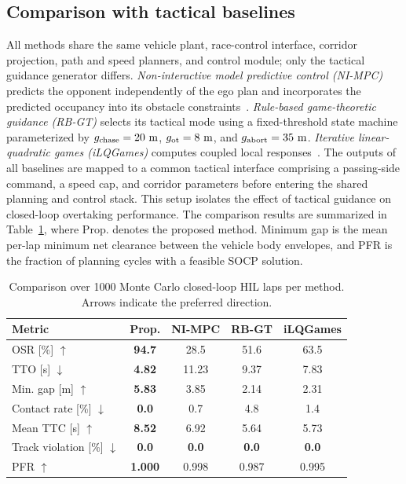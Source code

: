 \documentclass[journal,twoside,web]{ieeecolor}
\begin{document}

\subsection{Comparison with tactical baselines}
\label{subsec:comparison}

All methods share the same vehicle plant, race-control interface, corridor
projection, path and speed planners, and control module; only the tactical
guidance generator differs. \emph{Non-interactive model predictive control
(NI-MPC)} predicts the opponent
independently of the ego plan and incorporates the predicted occupancy into its
obstacle constraints~\cite{kabzan2020amzracing,betz2023autonomous}.
\emph{Rule-based game-theoretic guidance (RB-GT)} selects its tactical mode
using a fixed-threshold state machine parameterized by
\(g_{\rm chase}=20~\mathrm{m}\),
\(g_{\rm ot}=8~\mathrm{m}\), and \(g_{\rm abort}=35~\mathrm{m}\).
\emph{Iterative linear-quadratic games (iLQGames)} computes coupled local
responses~\cite{fridovich2020ilqgames}. The outputs
of all baselines are mapped to a common tactical interface comprising a
passing-side command, a speed cap, and corridor parameters before entering the
shared planning and control stack. This setup isolates the effect of tactical
guidance on closed-loop overtaking performance. The comparison results are
summarized in Table~\ref{tab:comparison}, where Prop. denotes the proposed
method. Minimum gap is the mean per-lap
minimum net clearance between the vehicle body envelopes, and PFR is the
fraction of planning cycles with a feasible SOCP solution.

\begin{table}[H]
\centering
\footnotesize
\setlength{\tabcolsep}{2.3pt}
\renewcommand{\arraystretch}{1.08}
\caption{Comparison over 1000 Monte Carlo closed-loop HIL laps per method.
Arrows indicate the preferred direction.}
\label{tab:comparison}
\begin{tabular}{@{}lcccc@{}}
\toprule
Metric & Prop. & NI-MPC & RB-GT & iLQGames \\
\midrule
OSR [\%] $\uparrow$
& \textbf{94.7} & 28.5 & 51.6 & 63.5 \\
TTO [s] $\downarrow$
& \textbf{4.82} & 11.23 & 9.37 & 7.83 \\
Min. gap [m] $\uparrow$
& \textbf{5.83} & 3.85 & 2.14 & 2.31 \\
Contact rate [\%] $\downarrow$
& \textbf{0.0} & 0.7 & 4.8 & 1.4 \\
Mean TTC [s] $\uparrow$
& \textbf{8.52} & 6.92 & 5.64 & 5.73 \\
Track violation [\%] $\downarrow$
& \textbf{0.0} & \textbf{0.0} & \textbf{0.0} & \textbf{0.0} \\
PFR $\uparrow$
& \textbf{1.000} & 0.998 & 0.987 & 0.995 \\
\bottomrule
\end{tabular}
\end{table}
\end{document}
